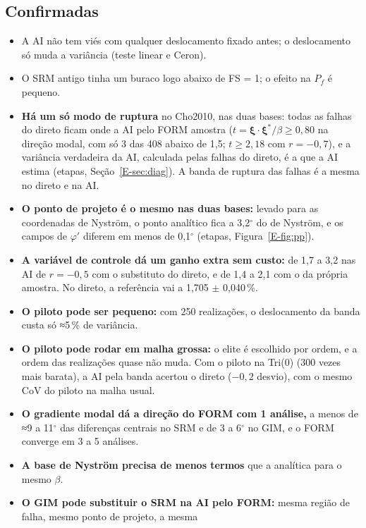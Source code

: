 \documentclass[11pt,a4paper]{article}
\begin{document}
\subsection*{Confirmadas}
\begin{itemize}
  \item A AI não tem viés com qualquer deslocamento fixado antes; o deslocamento só muda a variância (teste linear e Ceron).
  \item O SRM antigo tinha um buraco logo abaixo de FS = 1; o efeito na $P_f$ é pequeno.
  \item \textbf{Há um só modo de ruptura} no Cho2010, nas duas bases: todas as falhas do direto ficam onde a AI pelo
    FORM amostra ($t = \bm\xi\cdot\bm\xi^*/\beta \ge 0{,}80$ na direção modal, com só
    3 das 408 abaixo de 1,5;
    $t \ge 2{,}18$ com $r = -0{,}7$), e a variância verdadeira da AI,
    calculada pelas falhas do direto, é a que a AI estima (etapas, Seção~\ref{E-sec:diag}). A banda de ruptura das falhas
    é a mesma no direto e na AI.
  \item \textbf{O ponto de projeto é o mesmo nas duas bases:} levado para as coordenadas de Nyström, o ponto analítico
    fica a 3{,}2$^\circ$ do de Nyström, e os campos de $\varphi'$ diferem em
    menos de 0,1$^\circ$ (etapas, Figura~\ref{E-fig:pp}).
  \item \textbf{A variável de controle dá um ganho extra sem custo:} de 1{,}7 a
    3{,}2 nas AI de $r = -0{,}5$ com o substituto do direto, e de 1{,}4 a 2{,}1 com o da própria amostra. No direto, a referência vai
    a 1{,}705 $\pm$ 0{,}040\,\%.
  \item \textbf{O piloto pode ser pequeno:} com 250 realizações, o deslocamento da banda custa só ≈5\,\% de variância.
  \item \textbf{O piloto pode rodar em malha grossa:} o elite é escolhido por ordem, e a ordem das realizações quase não
    muda. Com o piloto na Tri(0) (300 vezes mais barata), a AI pela banda acertou o direto ($-0{,}2$ desvio), com o mesmo
    CoV do piloto na malha usual.
  \item \textbf{O gradiente modal dá a direção do FORM com 1 análise,} a menos de ≈9 a 11$^\circ$ das diferenças centrais
    no SRM e de 3 a 6$^\circ$ no GIM, e o FORM converge em 3 a 5 análises.
  \item \textbf{A base de Nyström precisa de menos termos} que a analítica para o mesmo $\beta$.
  \item \textbf{O GIM pode substituir o SRM na AI pelo FORM:} mesma região de falha, mesmo ponto de projeto, a mesma

\end{itemize}
\end{document}
